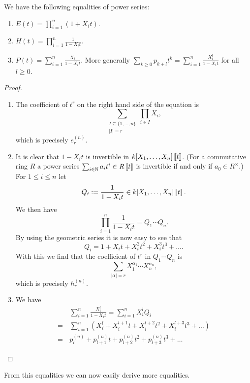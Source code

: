 \begin{prop}
 We have the following equalities of power series:
 \begin{enumerate}[1)]
  \item
   $E(t) = \prod_{i=1}^n (1 + X_i t)$.
  \item
   $H(t) = \prod_{i=1}^n \frac{1}{1 - X_i t}$.
  \item
   $P(t) = \sum_{i=1}^n \frac{X_i}{1 - X_i t}$. More generally $\sum_{k \geq 0} p_{k+l} t^k = \sum_{i=1}^n \frac{X_i^l}{1 - X_i t}$ for all $l \geq 0$.
 \end{enumerate}
\end{prop}
\begin{proof}
 \begin{enumerate}[1)]
  \item
   The coefficient of $t^r$ on the right hand side of the equation is
   \[
    \sum_{\substack{I \subseteq \{1, \ldots, n\} \\ |I| = r}} \prod_{i \in I} X_i,
   \]
   which is precisely $e^{(n)}_r$.
  \item
   It is clear that $1-X_i t$ is invertible in $k[X_1, \ldots, X_n]\left[\!\left[t\right]\!\right]$. (For a commutative ring $R$ a power series $\sum_{i \in \mathbb{N}} a_i t^i \in R\left[\!\left[t\right]\!\right]$ is invertible if and only if $a_0 \in R^\times$.) For $1 \leq i \leq n$ let
   \[
    Q_i := \frac{1}{1-X_i t} \in k[X_1, \ldots, X_n] \left[\!\left[t\right]\!\right].
   \]
   We then have
   \[
    \prod_{i=1}^n \frac{1}{1-X_i t} = Q_1 \cdots Q_n.
   \]
   By using the geometric series it is now easy to see that
   \[
    Q_i = 1 + X_i t + X_i^2 t^2 + X_i^3 t^3 + \ldots.
   \]
   With this we find that the coefficient of $t^r$ in $Q_1 \cdots Q_n$ is
   \[
    \sum_{|\alpha| = r} X_1^{\alpha_1} \cdots X_n^{\alpha_n},
   \]
   which is precisely $h^{(n)}_r$.
  \item
   We have
   \begin{align*}
     &\, \sum_{i=1}^n \frac{X_i^l}{1-X_i t}
    =    \sum_{i=1}^n X_i^l Q_i \\
    =&\, \sum_{i=1}^n (X_i^l + X_i^{l+1} t + X_i^{l+2} t^2 + X_i^{l+3} t^3 + \ldots) \\
    =&\, p^{(n)}_l + p^{(n)}_{l+1} t + p^{(n)}_{l+2} t^2 + p^{(n)}_{l+3} t^3 + \ldots
   \end{align*}\qedhere
 \end{enumerate}
\end{proof}


From this equalities we can now easily derive more equalities.


